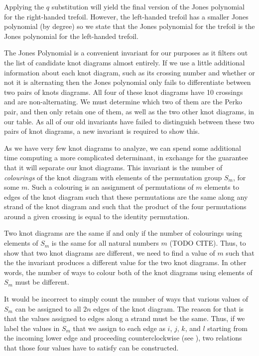 \begin{paper}
Applying the $q$ substitution will yield the final version of the Jones
polynomial for the right-handed trefoil.
However, the left-handed trefoil has a smaller Jones polynomial (by degree) so
we state that the Jones polynomial for the trefoil is the Jones polynomial for
the left-handed trefoil.




The Jones Polynomial is a convenient invariant for our purposes as it filters
out the list of candidate knot diagrams almost entirely.
If we use a little additional information about each knot diagram, such as its
crossing number and whether or not it is alternating then the Jones polynomial
only fails to differentiate between two pairs of knots diagrams.
All four of these knot diagrams have 10 crossings and are non-alternating.
We must determine which two of them are the Perko pair, and then only retain one
of them, as well as the two other knot diagrams, in our table.
As all of our old invariants have failed to distinguish between these two pairs
of knot diagrams, a new invariant is required to show this.

As we have very few knot diagrams to analyze, we can spend some additional time
computing a more complicated determinant, in exchange for the guarantee that it
will separate our knot diagrams.
This invariant is the number of \textit{colourings} of the knot diagram with
elements of the permutation group $S_m$, for some $m$.
Such a colouring is an assignment of permutations of $m$ elements to edges of
the knot diagram such that these permutations are the same along any strand of
the knot diagram and such that the product of the four permutations around a
given crossing is equal to the identity permutation.

Two knot diagrams are the same if and only if the number of colourings using
elements of $S_m$ is the same for all natural numbers $m$ (TODO CITE).
Thus, to show that two knot diagrams are different, we need to find a value of
$m$ such that the the invariant produces a different value for the two knot
diagrams.
In other words, the number of ways to colour both of the knot diagrams using
elements of $S_m$ must be different.

It would be incorrect to simply count the number of ways that various values of
$S_m$ can be assigned to all $2n$ edges of the knot diagram.
The reason for that is that the values assigned to edges along a strand must be
the same.
Thus, if we label the values in $S_m$ that we assign to each edge as $i$, $j$,
$k$, and $l$ starting from the incoming lower edge and proceeding
counterclockwise (see \figX), two relations that those four values have to
satisfy can be constructed.


\end{paper}
